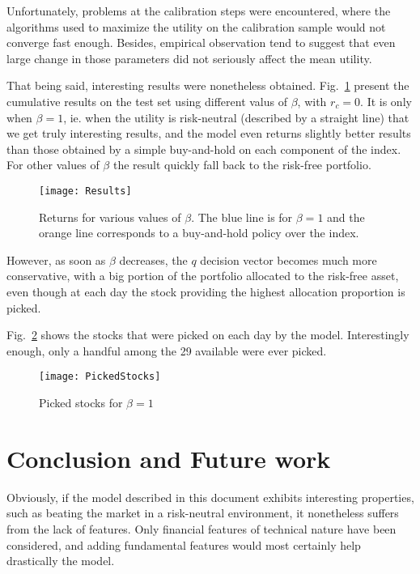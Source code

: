 \documentclass[11pt,fleqn]{article}
\newcommand{\figref}[1]{Fig.~\ref{#1}}
\begin{document}
Unfortunately, problems at the calibration steps were encountered, where the algorithms
used to maximize the utility on the calibration sample would not converge fast
enough. Besides, empirical observation tend to suggest that even large change in those
parameters did not seriously affect the mean utility.

That being said, interesting results were nonetheless obtained. \figref{fig:results}
present the cumulative results on the test set using different valus of $\beta$, with
$r_c=0$. It is only when $\beta=1$, ie. when the utility is risk-neutral (described by a
straight line) that we get truly interesting results, and the model even returns slightly
better results than those obtained by a simple buy-and-hold on each component of the
index. For other values of $\beta$ the result quickly fall back to the risk-free
portfolio.

\begin{figure}
  \centering
  \texttt{[image: Results]}
  \caption{Returns for various values of $\beta$. The blue line is for $\beta=1$ and the
    orange line corresponds to a buy-and-hold policy over the index.}
  \label{fig:results}
\end{figure}

However, as soon as $\beta$ decreases, the $q$ decision vector becomes much more
conservative, with a big portion of the portfolio allocated to the risk-free asset, even
though at each day the stock providing the highest allocation proportion is picked. 

\figref{fig:pickedstocks} shows the stocks that were picked on each day by the
model. Interestingly enough, only a handful among the 29 available were ever picked. 

\begin{figure}
  \centering
  \texttt{[image: PickedStocks]}
  \caption{Picked stocks for $\beta=1$}
  \label{fig:pickedstocks}
\end{figure}


\section{Conclusion and Future work}

Obviously, if the model described in this document exhibits interesting properties, such
as beating the market in a risk-neutral environment, it nonetheless suffers from the lack
of features. Only financial features of technical nature have been considered, and adding
fundamental features would most certainly help drastically the model. 
\end{document}
